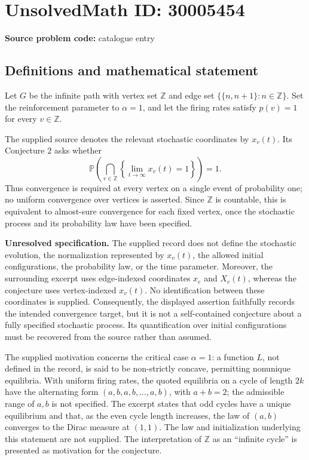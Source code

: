 \documentclass[11pt]{article}
\newcommand{\Z}{\mathbb{Z}}
\begin{document}
\section*{UnsolvedMath ID: 30005454}
\textbf{Source problem code:} catalogue entry
\subsection{Definitions and mathematical statement}
Let \(G\) be the infinite path with vertex set \(\Z\) and edge set \(\{\{n,n+1\}:n\in\Z\}\). Set the reinforcement parameter to \(\alpha=1\), and let the firing rates satisfy \(p(v)=1\) for every \(v\in\Z\).

The supplied source denotes the relevant stochastic coordinates by \(x_v(t)\). Its Conjecture 2 asks whether
\[
\mathbb P\!\left(\bigcap_{v\in\Z}\left\{\lim_{t\to\infty}x_v(t)=1\right\}\right)=1.
\]
Thus convergence is required at every vertex on a single event of probability one; no uniform convergence over vertices is asserted. Since \(\Z\) is countable, this is equivalent to almost-sure convergence for each fixed vertex, once the stochastic process and its probability law have been specified.

\textbf{Unresolved specification.} The supplied record does not define the stochastic evolution, the normalization represented by \(x_v(t)\), the allowed initial configurations, the probability law, or the time parameter. Moreover, the surrounding excerpt uses edge-indexed coordinates \(x_e\) and \(X_e(t)\), whereas the conjecture uses vertex-indexed \(x_v(t)\). No identification between these coordinates is supplied. Consequently, the displayed assertion faithfully records the intended convergence target, but it is not a self-contained conjecture about a fully specified stochastic process. Its quantification over initial configurations must be recovered from the source rather than assumed.

The supplied motivation concerns the critical case \(\alpha=1\): a function \(L\), not defined in the record, is said to be non-strictly concave, permitting nonunique equilibria. With uniform firing rates, the quoted equilibria on a cycle of length \(2k\) have the alternating form \((a,b,a,b,\ldots,a,b)\), with \(a+b=2\); the admissible range of \(a,b\) is not specified. The excerpt states that odd cycles have a unique equilibrium and that, as the even cycle length increases, the law of \((a,b)\) converges to the Dirac measure at \((1,1)\). The law and initialization underlying this statement are not supplied. The interpretation of \(\Z\) as an ``infinite cycle'' is presented as motivation for the conjecture.
\end{document}

